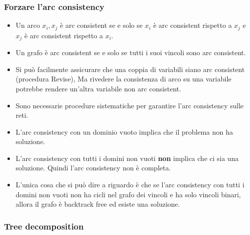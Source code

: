\documentclass[a4paper]{article}
\begin{document}
\subsubsection{Forzare l'arc consistency}
\begin{definition}
  \begin{itemize}
    \item Un arco \( x_i, x_j \) è arc consistent se e solo se \( x_i \) è arc consistent
    rispetto a \( x_j \) e \( x_j \) è arc consistent rispetto a \( x_i \).
    
    \item 
    Un grafo è arc consistent se e solo se tutti i suoi vincoli sono arc consistent.

    \item 
    Si può facilmente assicurare che una coppia di variabili siano arc consistent
    (procedura Revise),
    Ma rivedere la consistenza di arco su una variabile potrebbe rendere un'altra
    variabile non arc consistent.

    \item 
    Sono necessarie procedure sistematiche per garantire l'arc consistency sulle reti.
  \end{itemize}
\end{definition}
\begin{itemize}
  \item L'arc consistency con un dominio vuoto implica che il problema non ha soluzione.

  \item 
    L'arc consistency con tutti i domini non vuoti \textbf{non} implica che ci sia una soluzione.
    Quindi l'arc consistency non è completa. 

  \item L'unica cosa che si può dire a riguardo è che
    se l'arc consistency con tutti i domini non vuoti non ha cicli nel grafo dei vincoli
    e ha solo vincoli binari, allora il grafo è backtrack free ed esiste una soluzione.
\end{itemize}

\subsubsection{Tree decomposition}
\end{document}
